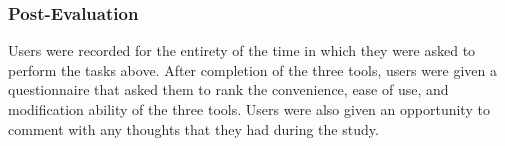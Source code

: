 \subsubsection{Post-Evaluation}
Users were recorded for the entirety of the time in which they were asked to perform the tasks above. After completion of the three tools, users were given a questionnaire that asked them to rank the convenience, ease of use, and modification ability of the three tools. Users were also given an opportunity to comment with any thoughts that they had during the study.